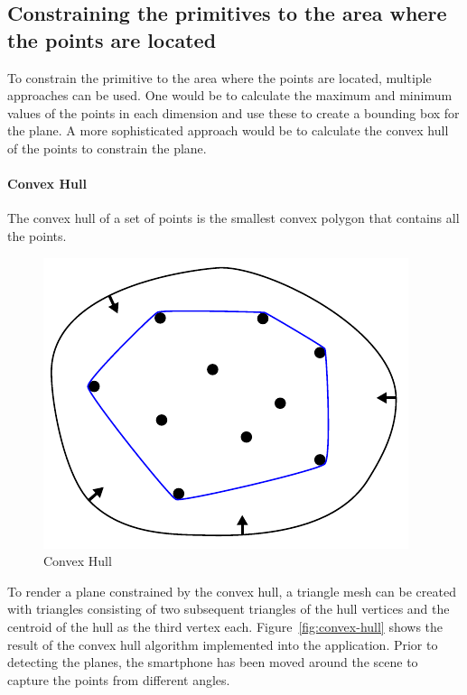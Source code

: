 \subsection{Constraining the primitives to the area where the points are located}
To constrain the primitive to the area where the points are located, multiple approaches can be used.
One would be to calculate the maximum and minimum values of the points in each dimension and use these to create a bounding box for the plane.
A more sophisticated approach would be to calculate the convex hull of the points to constrain the plane.

\paragraph{Convex Hull}
The convex hull of a set of points is the smallest convex polygon that contains all the points. %

\begin{figure}[ht!]
    \centering
    \includegraphics[width=0.35\linewidth]{images/ConvexHull}
    \caption{Convex Hull}
\end{figure}

To render a plane constrained by the convex hull,
a triangle mesh can be created with triangles consisting of two subsequent triangles of the hull vertices and the centroid of the hull as the third vertex each.
Figure~\ref{fig:convex-hull} shows the result of the convex hull algorithm implemented into the application.
Prior to detecting the planes, the smartphone has been moved around the scene to capture the points from different angles.

